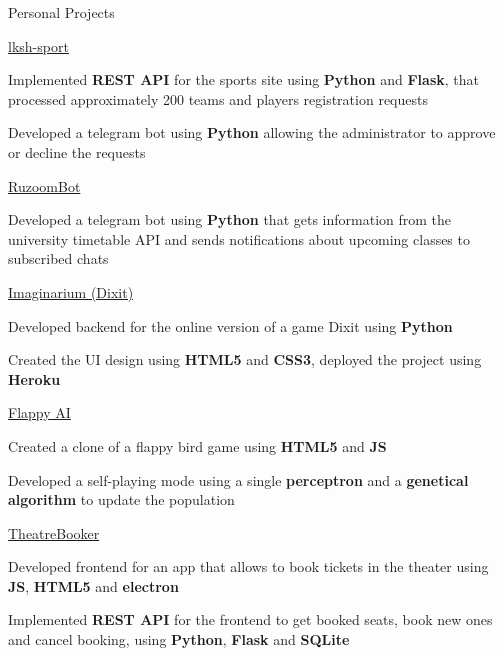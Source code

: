 \documentclass{./resume} %
\begin{document}

\begin{rSection}{Personal Projects}
    \begin{rSubsection}{\href{https://github.com/SphericalPotatoInVacuum/lksh_sport}{lksh-sport}}{}{}{}
        \item Implemented \textbf{REST API} for the sports site using \textbf{Python} and \textbf{Flask}, that processed approximately 200 teams and players registration requests
        \item Developed a telegram bot using \textbf{Python} allowing the administrator to approve or decline the requests
    \end{rSubsection}
    \begin{rSubsection}{\href{https://github.com/SphericalPotatoInVacuum/RuzoomBot}{RuzoomBot}}{}{}{}
        \item Developed a telegram bot using \textbf{Python} that gets information from the university timetable API and sends notifications about upcoming classes to subscribed chats
    \end{rSubsection}
    \begin{rSubsection}{\href{https://github.com/DKozl50/ya_dixit}{Imaginarium (Dixit)}}{}{}{}
        \item Developed backend for the online version of a game Dixit using \textbf{Python}
        \item Created the UI design using \textbf{HTML5} and \textbf{CSS3}, deployed the project using \textbf{Heroku}
    \end{rSubsection}
    \begin{rSubsection}{\href{https://github.com/SphericalPotatoInVacuum/FlappyAI}{Flappy AI}}{}{}{}
        \item Created a clone of a flappy bird game using \textbf{HTML5} and \textbf{JS}
        \item Developed a self-playing mode using a single \textbf{perceptron} and a \textbf{genetical algorithm} to update the population
    \end{rSubsection}
    \begin{rSubsection}{\href{https://github.com/SphericalPotatoInVacuum/TheatreBooker}{TheatreBooker}}{}{}{}
        \item Developed frontend for an app that allows to book tickets in the theater using \textbf{JS}, \textbf{HTML5} and \textbf{electron}
        \item Implemented \textbf{REST API} for the frontend to get booked seats, book new ones and cancel booking, using \textbf{Python}, \textbf{Flask} and \textbf{SQLite}
    \end{rSubsection}
\end{rSection}
\end{document}
